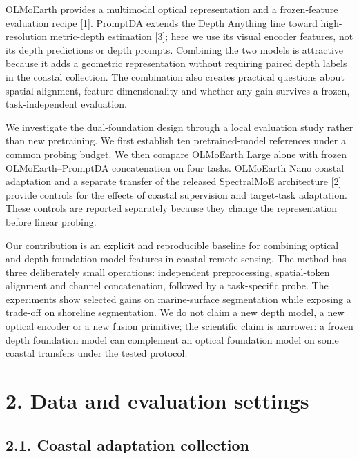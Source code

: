 \documentclass[
  10pt,
  english,
]{article}
\begin{document}
OLMoEarth provides a multimodal optical representation and a
frozen-feature evaluation recipe {[}1{]}. PromptDA extends the Depth
Anything line toward high-resolution metric-depth estimation {[}3{]};
here we use its visual encoder features, not its depth predictions or
depth prompts. Combining the two models is attractive because it adds a
geometric representation without requiring paired depth labels in the
coastal collection. The combination also creates practical questions
about spatial alignment, feature dimensionality and whether any gain
survives a frozen, task-independent evaluation.

We investigate the dual-foundation design through a local evaluation
study rather than new pretraining. We first establish ten
pretrained-model references under a common probing budget. We then
compare OLMoEarth Large alone with frozen OLMoEarth--PromptDA
concatenation on four tasks. OLMoEarth Nano coastal adaptation and a
separate transfer of the released SpectralMoE architecture {[}2{]}
provide controls for the effects of coastal supervision and target-task
adaptation. These controls are reported separately because they change
the representation before linear probing.

Our contribution is an explicit and reproducible baseline for combining
optical and depth foundation-model features in coastal remote sensing.
The method has three deliberately small operations: independent
preprocessing, spatial-token alignment and channel concatenation,
followed by a task-specific probe. The experiments show selected gains
on marine-surface segmentation while exposing a trade-off on shoreline
segmentation. We do not claim a new depth model, a new optical encoder
or a new fusion primitive; the scientific claim is narrower: a frozen
depth foundation model can complement an optical foundation model on
some coastal transfers under the tested protocol.

\hypertarget{data-and-evaluation-settings}{%
\section{2. Data and evaluation
settings}\label{data-and-evaluation-settings}}

\hypertarget{coastal-adaptation-collection}{%
\subsection{2.1. Coastal adaptation
collection}\label{coastal-adaptation-collection}}
\end{document}
